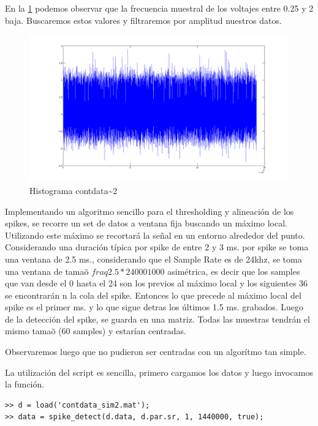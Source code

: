 \documentclass[a4paper,spanish]{article}
\begin{document}
En la \ref{fig4} podemos observar que la frecuencia muestral de los voltajes entre 0.25 y 2 baja. Buscaremos estos valores y filtraremos por amplitud nuestros datos.
\begin{figure}[htc]
	\centering
	\includegraphics[width=1.0\textwidth]{imgs/raw_cont_data.png}
	\caption{Histograma contdata\sim2}
	\label{fig4}
\end{figure}


Implementando un algoritmo sencillo para el thresholding y alineaci\'on de los spikes, se recorre un set de datos a ventana fija  buscando un m\'aximo local. Utilizando este m\'aximo se recortar\'a la se\~nal en un entorno alrededor del punto. Considerando una duraci\'on t\'ipica por spike de entre 2 y 3 ms. por spike se toma una ventana de 2.5 ms., considerando que el Sample Rate es de 24khz, se toma una ventana de tama\~o $ fraq{2.5 * 24000}{1000}$ asim\'etrica, es decir que los samples que van desde el 0 hasta el 24 son los previos al m\'aximo local y los siguientes 36 se encontrar\'an n la cola del spike. Entonces lo que precede al m\'aximo local del spike es el primer ms. y lo que sigue detras los \'ultimos 1.5 ms. grabados. Luego de la detecci\'on del spike, se guarda en una matriz. Todas las muestras tendr\'an el mismo tama\~o (60 samples) y estar\'ian centradas.

Observaremos luego que no pudieron ser centradas con un algor\'itmo tan simple.

La utilizaci\'on del script es sencilla, primero cargamos los datos y luego invocamos la funci\'on.

\begin{verbatim}
>> d = load('contdata_sim2.mat');
>> data = spike_detect(d.data, d.par.sr, 1, 1440000, true); 
\end{verbatim}
\end{document}
